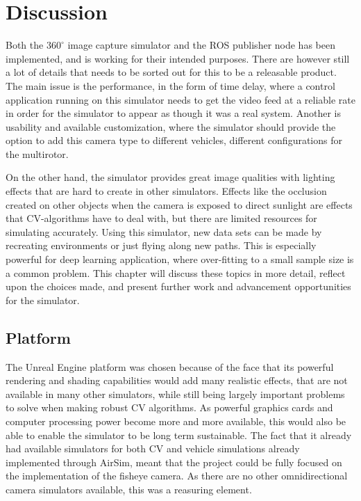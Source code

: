 \section{Discussion}

Both the $360^\circ$ image capture simulator and the ROS publisher node has been implemented, and is working for their intended purposes. There are however still a lot of details that needs to be sorted out for this to be a releasable product. The main issue is the performance, in the form of time delay, where a control application running on this simulator needs to get the video feed at a reliable rate in order for the simulator to appear as though it was a real system. Another is usability and available customization, where the simulator should provide the option to add this camera type to different vehicles, different configurations for the multirotor.

On the other hand, the simulator provides great image qualities with lighting effects that are hard to create in other simulators. Effects like the occlusion created on other objects when the camera is exposed to direct sunlight are effects that CV-algorithms have to deal with, but there are limited resources for simulating accurately. Using this simulator, new data sets can be made by recreating environments or just flying along new paths. This is especially powerful for deep learning application, where over-fitting to a small sample size is a common problem. This chapter will discuss these topics in more detail, reflect upon the choices made, and present further work and advancement opportunities for the simulator. 

\subsection{Platform}

The Unreal Engine platform was chosen because of the face that its powerful rendering and shading capabilities would add many realistic effects, that are not available in many other simulators, while still being largely important problems to solve when making robust CV algorithms. As powerful graphics cards and computer processing power become more and more available, this would also be able to enable the simulator to be long term sustainable. The fact that it already had available simulators for both CV and vehicle simulations already implemented through AirSim, meant that the project could be fully focused on the implementation of the fisheye camera. As there are no other omnidirectional camera simulators available, this was a reasuring element.

